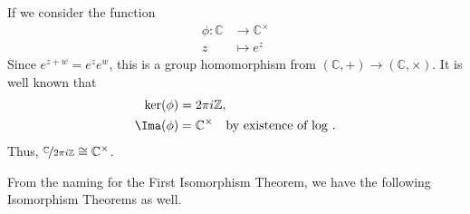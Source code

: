 \begin{eg}
    If we consider the function
    \begin{equation*}
    \begin{aligned}
      \phi\colon \mathbb{C} & \longrightarrow \mathbb{C}^\times      \\
      z          & \longmapsto e^z 
    \end{aligned}
    \end{equation*}
    Since \(e^{z + w} = e^z e^w\), this is a group homomorphism from \((\mathbb{C}, +) \to (\mathbb{C}, \times)\). It is well known that
    \begin{align*}
        \ker(\phi) &= 2\pi i \mathbb{Z},\\
        \Ima(\phi) &= \mathbb{C}^\times \quad \text{by existence of \(\log\) }.
    \end{align*}
    Thus, \(\nicefrac{\mathbb{C}}{2\pi i \mathbb{Z}} \cong \mathbb{C}^\times\).
\end{eg}

From the naming for the First Isomorphism Theorem, we have the following Isomorphism Theorems as well.

